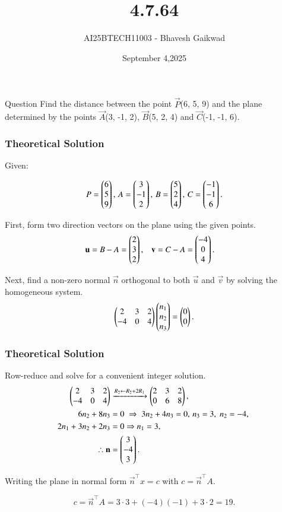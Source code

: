 \documentclass{beamer}
\title
{4.7.64}
\date{September 4,2025}
\author 
{AI25BTECH11003 - Bhavesh Gaikwad}
\begin{document}
\frame{\titlepage}
\begin{frame}{Question}
\centering
Find the distance between the point $\vec{P}$(6, 5, 9) and the plane determined by the points $\vec{A}$(3, -1, 2), $\vec{B}$(5, 2, 4) and $\vec{C}$(-1, -1, 6).
\end{frame}


\begin{frame}[fragile]
    \frametitle{Theoretical Solution}
Given:

\begin{align}
P = \begin{pmatrix}6\\5\\9\end{pmatrix}, \,
A = \begin{pmatrix}3\\-1\\2\end{pmatrix}, \,
B = \begin{pmatrix}5\\2\\4\end{pmatrix}, \,
C = \begin{pmatrix}-1\\-1\\6\end{pmatrix}.
\end{align}

First, form two direction vectors on the plane using the given points.
\begin{align}
\mathbf{u} &= B - A = \begin{pmatrix}2\\3\\2\end{pmatrix}, &
\mathbf{v} &= C - A = \begin{pmatrix}-4\\0\\4\end{pmatrix}.
\end{align}

Next, find a non-zero normal $\vec{n}$ orthogonal to both $\vec{u}$ and $\vec{v}$ by solving the homogeneous system.
\begin{equation}
\begin{pmatrix}2 & 3 & 2\\ -4 & 0 & 4\end{pmatrix}\begin{pmatrix}n_1\\n_2\\n_3\end{pmatrix}=\begin{pmatrix}0\\0\end{pmatrix}.
\end{equation}
\end{frame}

\begin{frame}[fragile]
\frametitle{Theoretical Solution}

Row-reduce and solve for a convenient integer solution.
\begin{align}
\begin{pmatrix}2 & 3 & 2\\ -4 & 0 & 4\end{pmatrix}
&\xrightarrow{R_2\leftarrow R_2+2R_1}
\begin{pmatrix}2 & 3 & 2\\ 0 & 6 & 8\end{pmatrix},\\
6n_2+8n_3&=0 \;\Rightarrow\; 3n_2+4n_3=0, \, 
n_3=3,\; n_2=-4,\; \\
2n_1+3n_2+2n_3&=0 \Rightarrow n_1=3,\\
\therefore \mathbf{n} &= \begin{pmatrix}3\\-4\\3\end{pmatrix}.
\end{align}

Writing the plane in normal form $\vec{n}^\top x = c$ with $c=\vec{n}^\top A$.

\begin{equation}
c=\vec{n}^\top A=3\cdot 3+(-4)(-1)+3\cdot 2=19.
\end{equation}
\end{frame}
\end{document}
